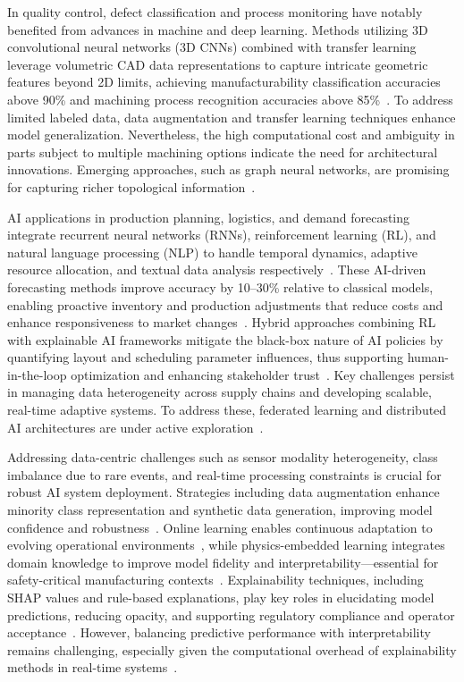 \documentclass[sigconf]{acmart}
\begin{document}
In quality control, defect classification and process monitoring have notably benefited from advances in machine and deep learning. Methods utilizing 3D convolutional neural networks (3D CNNs) combined with transfer learning leverage volumetric CAD data representations to capture intricate geometric features beyond 2D limits, achieving manufacturability classification accuracies above 90\% and machining process recognition accuracies above 85\%~\cite{ref39,ref40}. To address limited labeled data, data augmentation and transfer learning techniques enhance model generalization. Nevertheless, the high computational cost and ambiguity in parts subject to multiple machining options indicate the need for architectural innovations. Emerging approaches, such as graph neural networks, are promising for capturing richer topological information~\cite{ref39}.

AI applications in production planning, logistics, and demand forecasting integrate recurrent neural networks (RNNs), reinforcement learning (RL), and natural language processing (NLP) to handle temporal dynamics, adaptive resource allocation, and textual data analysis respectively~\cite{ref40,ref45}. These AI-driven forecasting methods improve accuracy by 10–30\% relative to classical models, enabling proactive inventory and production adjustments that reduce costs and enhance responsiveness to market changes~\cite{ref40}. Hybrid approaches combining RL with explainable AI frameworks mitigate the black-box nature of AI policies by quantifying layout and scheduling parameter influences, thus supporting human-in-the-loop optimization and enhancing stakeholder trust~\cite{ref9,ref45}. Key challenges persist in managing data heterogeneity across supply chains and developing scalable, real-time adaptive systems. To address these, federated learning and distributed AI architectures are under active exploration~\cite{ref40}.

Addressing data-centric challenges such as sensor modality heterogeneity, class imbalance due to rare events, and real-time processing constraints is crucial for robust AI system deployment. Strategies including data augmentation enhance minority class representation and synthetic data generation, improving model confidence and robustness~\cite{ref29}. Online learning enables continuous adaptation to evolving operational environments~\cite{ref29}, while physics-embedded learning integrates domain knowledge to improve model fidelity and interpretability—essential for safety-critical manufacturing contexts~\cite{ref34}. Explainability techniques, including SHAP values and rule-based explanations, play key roles in elucidating model predictions, reducing opacity, and supporting regulatory compliance and operator acceptance~\cite{ref30,ref38}. However, balancing predictive performance with interpretability remains challenging, especially given the computational overhead of explainability methods in real-time systems~\cite{ref37}.
\end{document}
